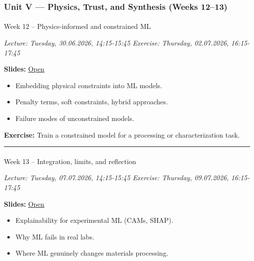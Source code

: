 \documentclass[
]{agujournal2019}
\makeatletter
\let\oldparagraph\paragraph
\renewcommand{\paragraph}{
    \@ifstar
      \xxxParagraphStar
      \xxxParagraphNoStar
  }
\newcommand{\xxxParagraphStar}[1]{\oldparagraph*{#1}\mbox{}}
\newcommand{\xxxParagraphNoStar}[1]{\oldparagraph{#1}\mbox{}}
\providecommand{\tightlist}{%
  \setlength{\itemsep}{0pt}\setlength{\parskip}{0pt}}
\makeatother
\begin{document}
\subsubsection{Unit V --- Physics, Trust, and Synthesis (Weeks
12--13)}\label{unit-v-physics-trust-and-synthesis-weeks-1213}

\paragraph{Week 12 -- Physics-informed and constrained
ML}\label{week-12-physics-informed-and-constrained-ml}

\emph{Lecture: Tuesday, 30.06.2026, 14:15-15:45 \textbar{} Exercise:
Thursday, 02.07.2026, 16:15-17:45}

\textbf{Slides:}
\href{https://pelzlab.science/public_presentations/ml_for_characterization_and_processing/unit12_pinns/13_pinns.html}{Open}

\begin{itemize}
\tightlist
\item
  Embedding physical constraints into ML models.
\item
  Penalty terms, soft constraints, hybrid approaches.
\item
  Failure modes of unconstrained models.
\end{itemize}

\textbf{Exercise:} Train a constrained model for a processing or
characterization task.

\begin{center}\rule{0.5\linewidth}{0.5pt}\end{center}

\paragraph{Week 13 -- Integration, limits, and
reflection}\label{week-13-integration-limits-and-reflection}

\emph{Lecture: Tuesday, 07.07.2026, 14:15-15:45 \textbar{} Exercise:
Thursday, 09.07.2026, 16:15-17:45}

\textbf{Slides:}
\href{https://pelzlab.science/public_presentations/ml_for_characterization_and_processing/unit13_reflection/14_reflection.html}{Open}

\begin{itemize}
\tightlist
\item
  Explainability for experimental ML (CAMs, SHAP).
\item
  Why ML fails in real labs.
\item
  Where ML genuinely changes materials processing.
\end{itemize}
\end{document}
